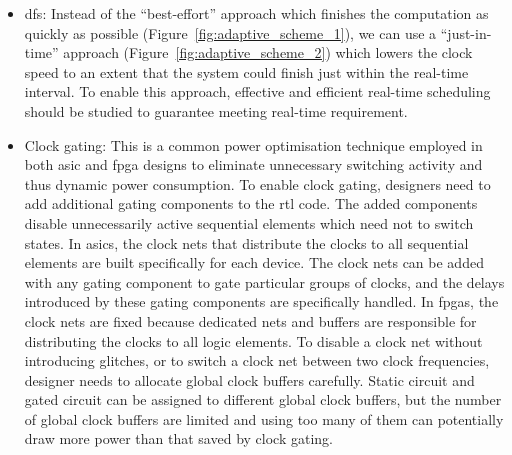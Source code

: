 \begin{itemize}
\item \gls{dfs}: Instead of the ``best-effort'' approach which finishes the computation as quickly as possible (Figure~\ref{fig:adaptive_scheme_1}), we can use a ``just-in-time'' approach (Figure~\ref{fig:adaptive_scheme_2}) which lowers the clock speed to an extent that the system could finish just within the real-time interval.
To enable this approach, effective and efficient real-time scheduling should be studied to guarantee meeting real-time requirement.
\item Clock gating: This is a common power optimisation technique employed in both \gls{asic} and \gls{fpga} designs to eliminate unnecessary switching activity and thus dynamic power consumption.
To enable clock gating, designers need to add additional gating components to the \gls{rtl} code.
The added components disable unnecessarily active sequential elements which need not to switch states.
In \glspl{asic}, the clock nets that distribute the clocks to all sequential elements are built specifically for each device.
The clock nets can be added with any gating component to gate particular groups of clocks, and the delays introduced by these gating components are specifically handled.
In \glspl{fpga}, the clock nets are fixed because dedicated nets and buffers are responsible for distributing the clocks to all logic elements.
To disable a clock net without introducing glitches, or to switch a clock net between two clock frequencies, designer needs to allocate global clock buffers carefully.
Static circuit and gated circuit can be assigned to different global clock buffers, but the number of global clock buffers are limited and using too many of them can potentially draw more power than that saved by clock gating.
\end{itemize}

